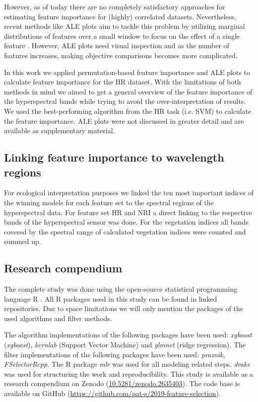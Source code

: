 \documentclass[letterpaper, peerreview, draftcls]{IEEEtran}
\begin{document}
However, as of today there are no completely satisfactory approaches for estimating feature importance for (highly) correlated datasets.
Nevertheless, recent methods like \ac{ALE} plots aim to tackle this problem by utilizing marginal distributions of features over a small window to focus on the effect of a single feature \cite{apley2019, molnar2019}.
However, ALE plots need visual inspection and as the number of features increases, making objective comparisons becomes more complicated.

In this work we applied permutation-based feature importance and \ac{ALE} plots to calculate feature importance for the HR dataset.
With the limitations of both methods in mind we aimed to get a general overview of the feature importance of the hyperspectral bands while trying to avoid the over-interpretation of results.
We used the best-performing algorithm from the HR task (i.e. SVM) to calculate the feature importance.
ALE plots were not discussed in greater detail and are available as supplementary material.

\subsection{Linking feature importance to wavelength regions}

\noindent For ecological interpretation purposes we linked the ten most important indices of the winning models for each feature set to the spectral regions of the hyperspectral data.
For feature set HR and NRI a direct linking to the respective bands of the hyperspectral sensor was done.
For the vegetation indices all bands covered by the spectral range of calculated vegetation indices were counted and summed up.

\subsection{Research compendium}

\noindent The complete study was done using the open-source statistical programming language R \cite{rcoreteam2019}.
All R packages used in this study can be found in linked repositories.
Due to space limitations we will only mention the packages of the used algorithms and filter methods.

The algorithm implementations of the following packages have been used: \textit{xgboost}\cite{chen2016} (\textit{xgboost}), \textit{kernlab}\cite{kernlab} (Support Vector Machine) and \textit{glmnet}\cite{glmnet} (ridge regression).
The filter implementations of the following packages have been used: \textit{praznik\cite{praznik}}, \textit{FSelectorRcpp}\cite{fselectorrcpp}.
The R package \textit{mlr} \cite{mlr} was used for all modeling related steps.
\textit{drake} \cite{drake} was used for structuring the work and reproducibility.
This study is available as a research compendium on Zenodo (\url{10.5281/zenodo.2635403}).
The code base is available on GitHub (\url{https://github.com/pat-s/2019-feature-selection}).
\end{document}
